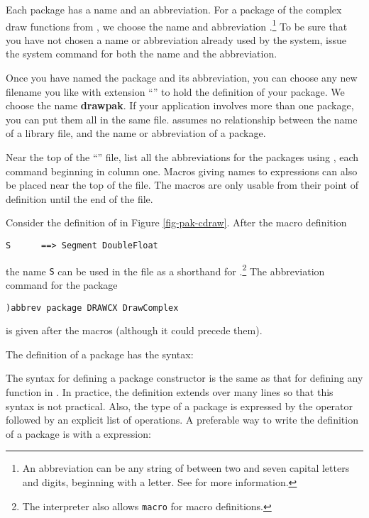 %
Each package has a name and an abbreviation.
For a package of the complex draw functions from ,
we choose the name 
and
abbreviation .\footnote{An abbreviation can be any string
of
between two and seven capital letters and digits, beginning with a letter.
See  for more information.}
To be sure that you have not chosen a name or abbreviation already used by
the system, issue the system command  for both the name and
the abbreviation.

Once you have named the package and its abbreviation, you can choose any new
filename you like with extension ``{\bf \spadFileExt{}}'' to hold the
definition of your package.
We choose the name {\bf drawpak\spadFileExt{}}.
If your application involves more than one package, you
can put them all in the same file.
\Language{} assumes no relationship between the name of a library file, and
the name or abbreviation of a package.

Near the top of the ``{\bf \spadFileExt{}}'' file, list all the
abbreviations for the packages
using , each command beginning in column one.
Macros giving names to \Language{} expressions can also be placed near the
top of the file.
The macros are only usable from their point of definition until the
end of the file.

Consider the definition of
 in Figure \ref{fig-pak-cdraw}.
After the macro
definition
\begin{verbatim}
S      ==> Segment DoubleFloat
\end{verbatim}
the name
{\tt S} can be used in the file as a
shorthand for .\footnote{The interpreter also allows
{\tt macro} for macro definitions.}
The abbreviation command for the package
\begin{verbatim}
)abbrev package DRAWCX DrawComplex
\end{verbatim}
is given after the macros (although it could precede them).

%
The definition of a package has the syntax:
\begin{center}
\end{center}
The syntax for defining a package constructor is the same as that
for defining any function in \Language{}.
In practice, the definition extends over many lines so that this syntax is
not practical.
Also, the type of a package is expressed by the operator 
followed by an explicit list of operations.
A preferable way to write the definition of a package is with a 
expression:

